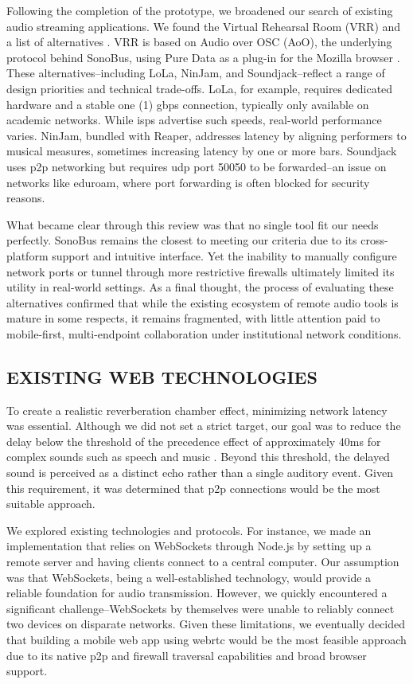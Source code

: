 \documentclass[fleqn]{jaes}
\begin{document}
Following the completion of the prototype, we broadened our search of existing audio streaming applications. We found the Virtual Rehearsal Room (VRR) and a list of alternatives \cite{vrr_alternatives}. VRR is based on Audio over OSC (AoO), the underlying protocol behind SonoBus, using Pure Data as a plug-in for the Mozilla browser \cite{ritsch2014towards}. These alternatives--including LoLa, NinJam, and Soundjack--reflect a range of design priorities and technical trade-offs. LoLa, for example, requires dedicated hardware and a stable one (1) \gls{gbps} connection, typically only available on academic networks. While \glspl{isp} advertise such speeds, real-world performance varies. NinJam, bundled with Reaper, addresses latency by aligning performers to musical measures, sometimes increasing latency by one or more bars. Soundjack uses \gls{p2p} networking but requires \gls{udp} port 50050 to be forwarded--an issue on networks like eduroam, where port forwarding is often blocked for security reasons.

What became clear through this review was that no single tool fit our needs perfectly. SonoBus remains the closest to meeting our criteria due to its cross-platform support and intuitive interface. Yet the inability to manually configure network ports or tunnel through more restrictive firewalls ultimately limited its utility in real-world settings. As a final thought, the process of evaluating these alternatives confirmed that while the existing ecosystem of remote audio tools is mature in some respects, it remains fragmented, with little attention paid to mobile-first, multi-endpoint collaboration under institutional network conditions.

\subsection{EXISTING WEB TECHNOLOGIES}
To create a realistic reverberation chamber effect, minimizing network latency was essential. Although we did not set a strict target, our goal was to reduce the delay below the threshold of the precedence effect of approximately 40ms for complex sounds such as speech and music \cite{wallach1949precedence}. Beyond this threshold, the delayed sound is perceived as a distinct echo rather than a single auditory event. Given this requirement, it was determined that \gls{p2p} connections would be the most suitable approach.

We explored existing technologies and protocols. For instance, we made an implementation that relies on WebSockets through Node.js by setting up a remote server and having clients connect to a central computer. Our assumption was that WebSockets, being a well-established technology, would provide a reliable foundation for audio transmission. However, we quickly encountered a significant challenge--WebSockets by themselves were unable to reliably connect two devices on disparate networks. Given these limitations, we eventually decided that building a mobile web app using \gls{webrtc} would be the most feasible approach due to its native \gls{p2p} and firewall traversal capabilities and broad browser support.
\end{document}

